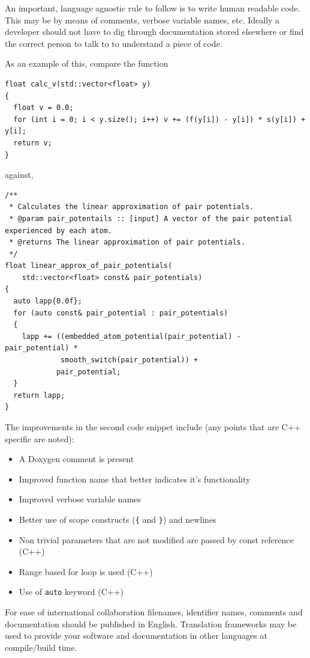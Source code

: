 \documentclass[jnr]{iosart2x}
\begin{document}
An important, language agnostic rule to follow is to write human readable code.
This may be by means of comments, verbose variable names, etc.
Ideally a developer should not have to dig through documentation stored elsewhere or find the correct person to talk to to understand a piece of code.

As an example of this, compare the function \cite{Lim_2015}

\begin{lstlisting}
float calc_v(std::vector<float> y)
{
  float v = 0.0;
  for (int i = 0; i < y.size(); i++) v += (f(y[i]) - y[i]) * s(y[i]) + y[i];
  return v;
}
\end{lstlisting}

against,

\begin{lstlisting}
/**
 * Calculates the linear approximation of pair potentials.
 * @param pair_potentails :: [input] A vector of the pair potential experienced by each atom.
 * @returns The linear approximation of pair potentials.
 */
float linear_approx_of_pair_potentials(
    std::vector<float> const& pair_potentials)
{
  auto lapp{0.0f};
  for (auto const& pair_potential : pair_potentials)
  {
    lapp += ((embedded_atom_potential(pair_potential) - pair_potential) *
             smooth_switch(pair_potential)) +
            pair_potential;
  }
  return lapp;
}
\end{lstlisting}

The improvements in the second code snippet include (any points that are C++ specific are noted):
\begin{itemize}
  \item{A Doxygen comment is present}
  \item{Improved function name that better indicates it's functionality}
  \item{Improved verbose variable names}
  \item{Better use of scope constructs (\texttt{\{} and \texttt{\}}) and newlines}
  \item{Non trivial parameters that are not modified are passed by const reference (C++)}
  \item{Range based for loop is used (C++)}
  \item{Use of \texttt{auto} keyword (C++)}
\end{itemize}

For ease of international collaboration filenames, identifier names, comments and documentation should be published in English.
Translation frameworks may be used to provide your software and documentation in other languages at compile/build time.
\end{document}
